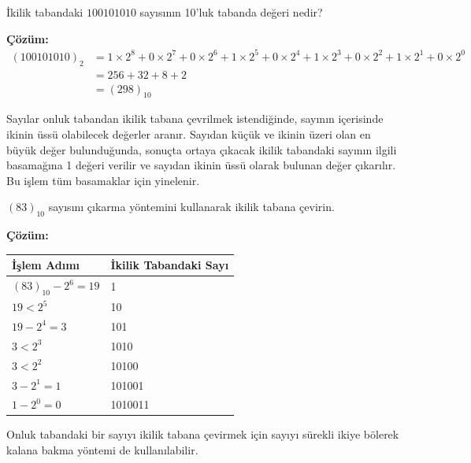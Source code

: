 \begin{ornek}[A.2]
İkilik tabandaki $100101010$ sayısının 10'luk tabanda değeri nedir?

\textbf{Çözüm:}
\begin{align*}
(100101010)_2 &= 1\times 2^8 + 0\times 2^7 + 0\times 2^6 + 1\times 2^5 + 0\times 2^4 + 1\times 2^3 + 0\times 2^2 + 1\times 2^1 + 0\times 2^0 \\
&= 256 + 32 + 8 + 2 \\
&= (298)_{10}
\end{align*}
\end{ornek}

Sayılar onluk tabandan ikilik tabana çevrilmek istendiğinde, sayının içerisinde ikinin üssü olabilecek değerler aranır. Sayıdan küçük ve ikinin üzeri olan en büyük değer bulunduğunda, sonuçta ortaya çıkacak ikilik tabandaki sayının ilgili basamağına 1 değeri verilir ve sayıdan ikinin üssü olarak bulunan değer çıkarılır. Bu işlem tüm basamaklar için yinelenir.

\begin{ornek}[A.3]
$(83)_{10}$ sayısını çıkarma yöntemini kullanarak ikilik tabana çevirin.

\textbf{Çözüm:}

\begin{table}[H]
\centering
\begin{tabular}{ll}
\toprule
\textbf{İşlem Adımı} & \textbf{İkilik Tabandaki Sayı} \\
\midrule
$(83)_{10} - 2^6 = 19$ & 1 \\
$19 < 2^5$ & 10 \\
$19 - 2^4 = 3$ & 101 \\
$3 < 2^3$ & 1010 \\
$3 < 2^2$ & 10100 \\
$3 - 2^1 = 1$ & 101001 \\
$1 - 2^0 = 0$ & 1010011 \\
\bottomrule
\end{tabular}
\end{table}
\end{ornek}

Onluk tabandaki bir sayıyı ikilik tabana çevirmek için sayıyı sürekli ikiye bölerek kalana bakma yöntemi de kullanılabilir.


